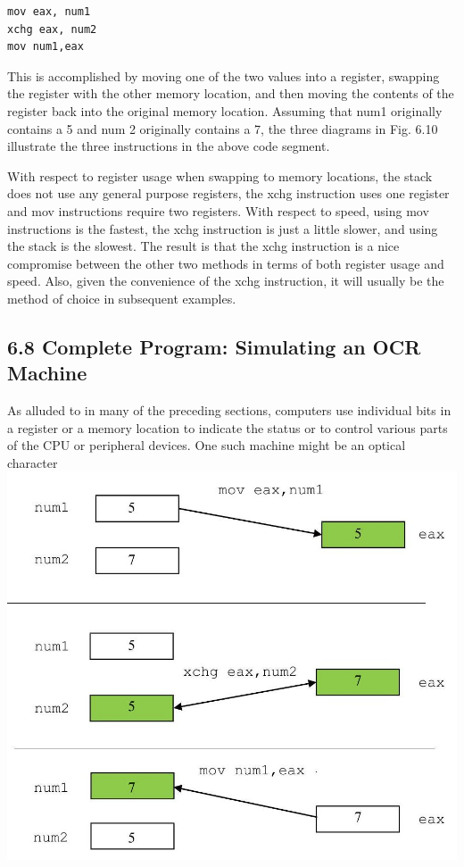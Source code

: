 \documentclass[10pt]{article}
\begin{document}
\begin{verbatim}
mov eax, num1
xchg eax, num2
mov num1,eax
\end{verbatim}

This is accomplished by moving one of the two values into a register, swapping the register with the other memory location, and then moving the contents of the register back into the original memory location. Assuming that num1 originally contains a 5 and num 2 originally contains a 7, the three diagrams in Fig. 6.10 illustrate the three instructions in the above code segment.

With respect to register usage when swapping to memory locations, the stack does not use any general purpose registers, the xchg instruction uses one register and mov instructions require two registers. With respect to speed, using mov instructions is the fastest, the xchg instruction is just a little slower, and using the stack is the slowest. The result is that the xchg instruction is a nice compromise between the other two methods in terms of both register usage and speed. Also, given the convenience of the xchg instruction, it will usually be the method of choice in subsequent examples.

\subsection*{6.8 Complete Program: Simulating an OCR Machine}
As alluded to in many of the preceding sections, computers use individual bits in a register or a memory location to indicate the status or to control various parts of the CPU or peripheral devices. One such machine might be an optical character\\
\includegraphics[max width=\textwidth, center]{2025_03_24_ebe50cc223a6fbc49eecg-130}
\end{document}
